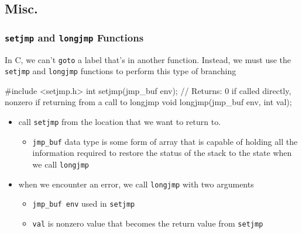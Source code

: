 \documentclass[newPxFont,sthlmFooter,nooffset]{beamer}
\begin{document}
\subsection{Misc.}

\begin{frame}[containsverbatim,t]
  \frametitle{\texttt{setjmp} and \texttt{longjmp} Functions}
In C, we can't \texttt{goto} a label that's in another function. Instead, we must use the \texttt{setjmp} and \texttt{longjmp} functions to perform this type of branching
\begin{codedef}
 #include <setjmp.h>
int setjmp(jmp_buf env);
// Returns: 0 if called directly, nonzero if returning from a call to longjmp
void longjmp(jmp_buf env, int val);
\end{codedef}
\begin{itemize}
\item call \texttt{setjmp} from the location that we want to return to.
  \begin{itemize}
  \item \texttt{jmp\_buf} data type is some form of array that is capable of holding all the information required to restore the status of the stack to the state when we call \texttt{longjmp}
  \end{itemize}
\item when we encounter an error, we call \texttt{longjmp} with two arguments
  \begin{itemize}
  \item \texttt{jmp\_buf env} used in \texttt{setjmp}
  \item \texttt{val} is nonzero value that becomes the return value from \texttt{setjmp}
  \end{itemize}
\end{itemize}
\end{frame}
\end{document}

